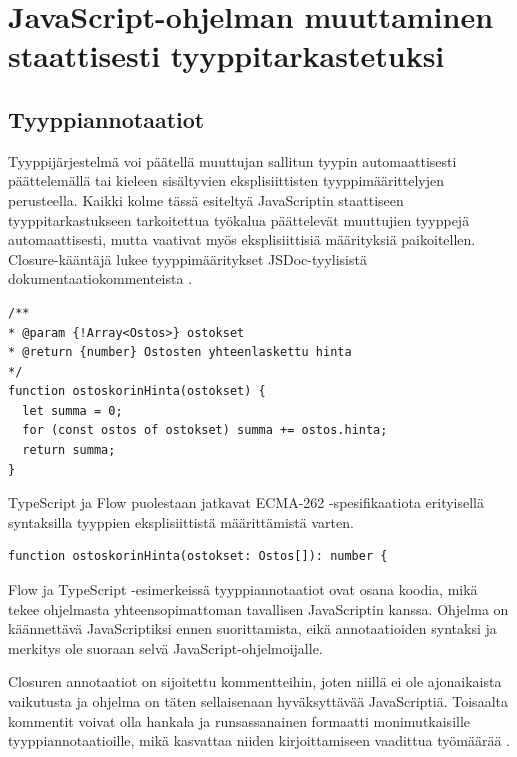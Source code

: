 \chapter{JavaScript-ohjelman muuttaminen staattisesti tyyppitarkastetuksi}

\section{Tyyppiannotaatiot}

Tyyppijärjestelmä voi päätellä muuttujan sallitun tyypin automaattisesti
päättelemällä tai kieleen sisältyvien eksplisiittisten tyyppimäärittelyjen
perusteella. Kaikki kolme tässä esiteltyä JavaScriptin staattiseen
tyyppitarkastukseen tarkoitettua työkalua päättelevät muuttujien tyyppejä automaattisesti, mutta vaativat
myös eksplisiittisiä määrityksiä paikoitellen. 
Closure-kääntäjä lukee
tyyppimääritykset JSDoc-tyylisistä dokumentaatiokommenteista \cite{annotatingJSforClosure}.

\begin{minipage}{\linewidth}
\begin{lstlisting}[caption={Esimerkki Closure-annotaatiosta funktiolle},label={lst:ostoskorin_hinta_clojure}]
/**
* @param {!Array<Ostos>} ostokset
* @return {number} Ostosten yhteenlaskettu hinta
*/
function ostoskorinHinta(ostokset) {
  let summa = 0;
  for (const ostos of ostokset) summa += ostos.hinta;
  return summa;
}
\end{lstlisting}
\end{minipage}
TypeScript ja Flow puolestaan jatkavat ECMA-262 -spesifikaatiota erityisellä syntaksilla
tyyppien eksplisiittistä määrittämistä varten. 

\begin{minipage}{\linewidth}
\begin{lstlisting}[caption={Esimerkki Flow tai TypeScript annotaatiosta funktiolle},label={lst:ostoskorin_hinta_flow}]
function ostoskorinHinta(ostokset: Ostos[]): number {
\end{lstlisting}
\end{minipage}

Flow ja TypeScript -esimerkeissä tyyppiannotaatiot ovat osana koodia, mikä
tekee ohjelmasta yhteensopimattoman tavallisen JavaScriptin kanssa. Ohjelma
on käännettävä JavaScriptiksi ennen suorittamista, eikä annotaatioiden
syntaksi ja merkitys ole suoraan selvä JavaScript-ohjelmoijalle. 

Closuren annotaatiot on sijoitettu kommentteihin, joten niillä ei ole
ajonaikaista vaikutusta ja ohjelma on täten sellaisenaan hyväksyttävää
JavaScriptiä. Toisaalta kommentit voivat olla hankala ja runsassanainen
formaatti monimutkaisille tyyppiannotaatioille, mikä kasvattaa niiden
kirjoittamiseen vaadittua työmäärää \cite{TypeScriptSpec, TypeScriptatBuild}.

